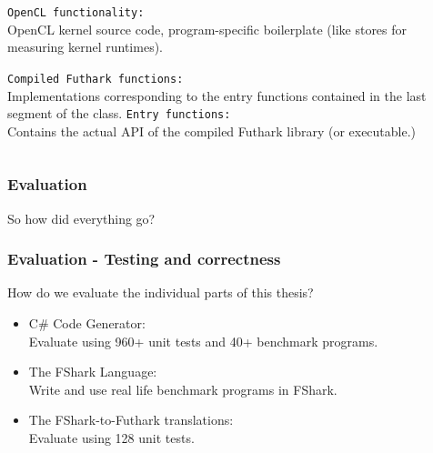 \documentclass[10pt, compress, usenames, dvipsnames]{beamer}
\begin{document}
\begin{frame}[fragile]
\begin{columns}
\begin{column}{.48\textwidth}
\begin{overprint}
      {
      \texttt{OpenCL functionality:}\\
      OpenCL kernel source code, program-specific boilerplate (like stores for
      measuring kernel runtimes).
      }

      {
      \texttt{Compiled Futhark functions:}\\
      Implementations corresponding to the entry functions contained in the
      last segment of the class.
      }
      {
      \texttt{Entry functions:}\\
      Contains the actual API of the compiled Futhark library (or executable.)
      }
      \end{overprint}
    \end{column}
  \end{columns}
\end{frame}

\begin{frame}[fragile]
  \frametitle{Evaluation}
  \begin{center}
    \Huge So how did everything go?
  \end{center}
\end{frame}

\begin{frame}[fragile]
  \frametitle{Evaluation - Testing and correctness}
  How do we evaluate the individual parts of this thesis?
  \begin{itemize}
  \item<2-> C\# Code Generator:\\
    Evaluate using 960+ unit tests and 40+ benchmark programs.
\item<3-> The FShark Language:\\
  Write and use real life benchmark programs in FShark.
\item<4-> The FShark-to-Futhark translations:\\
  Evaluate using 128 unit tests.
  \end{itemize}
\end{frame}
\end{document}
